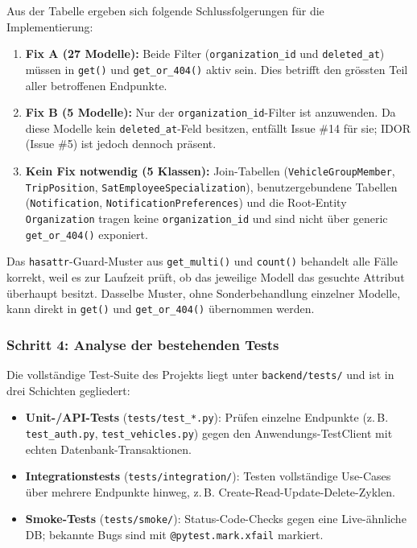 Aus der Tabelle ergeben sich folgende Schlussfolgerungen für die Implementierung:

\begin{enumerate}
    \item \textbf{Fix A (27 Modelle):} Beide Filter (\texttt{organization\_id} und
          \texttt{deleted\_at}) müssen in \texttt{get()} und \texttt{get\_or\_404()} aktiv sein.
          Dies betrifft den grössten Teil aller betroffenen Endpunkte.
    \item \textbf{Fix B (5 Modelle):} Nur der \texttt{organization\_id}-Filter ist
          anzuwenden. Da diese Modelle kein \texttt{deleted\_at}-Feld besitzen, entfällt
          Issue \#14 für sie; IDOR (Issue \#5) ist jedoch dennoch präsent.
    \item \textbf{Kein Fix notwendig (5 Klassen):} Join-Tabellen
          (\texttt{VehicleGroupMember}, \texttt{TripPosition},
          \texttt{SatEmployeeSpecialization}), benutzergebundene Tabellen
          (\texttt{Notification}, \texttt{NotificationPreferences}) und die Root-Entity
          \texttt{Organization} tragen keine \texttt{organization\_id} und sind
          nicht über generic \texttt{get\_or\_404()} exponiert.
\end{enumerate}

Das \texttt{hasattr}-Guard-Muster aus \texttt{get\_multi()} und \texttt{count()}
behandelt alle Fälle korrekt, weil es zur Laufzeit prüft, ob das jeweilige Modell das
gesuchte Attribut überhaupt besitzt. Dasselbe Muster, ohne Sonderbehandlung einzelner
Modelle, kann direkt in \texttt{get()} und \texttt{get\_or\_404()} übernommen werden.


\subsubsection{Schritt 4: Analyse der bestehenden Tests}

Die vollständige Test-Suite des Projekts liegt unter \texttt{backend/tests/} und ist
in drei Schichten gegliedert:

\begin{itemize}
    \item \textbf{Unit-/API-Tests} (\texttt{tests/test\_*.py}): Prüfen einzelne Endpunkte
          (z.\,B. \texttt{test\_auth.py}, \texttt{test\_vehicles.py}) gegen den
          Anwendungs-TestClient mit echten Datenbank-Transaktionen.
    \item \textbf{Integrationstests} (\texttt{tests/integration/}): Testen vollständige
          Use-Cases über mehrere Endpunkte hinweg, z.\,B. Create-Read-Update-Delete-Zyklen.
    \item \textbf{Smoke-Tests} (\texttt{tests/smoke/}): Status-Code-Checks gegen eine
          Live-ähnliche DB; bekannte Bugs sind mit \texttt{@pytest.mark.xfail} markiert.
\end{itemize}

